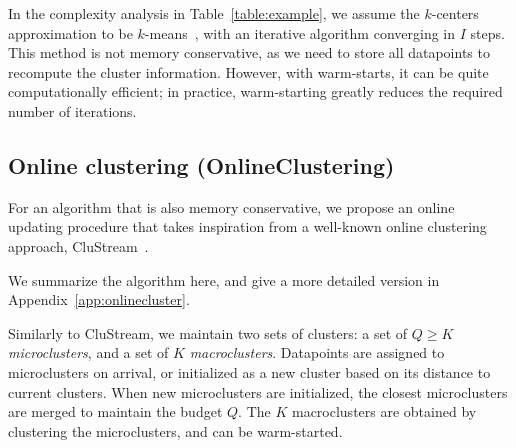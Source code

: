  

In the complexity analysis in Table~\ref{table:example}, we assume the $k$-centers approximation to be $k$-means~\cite{kmeans}, with an iterative algorithm converging in $I$ steps. 
This method is not memory conservative, as we need to store all datapoints to recompute the cluster information. 
However, with warm-starts, it can be quite computationally efficient; in practice, warm-starting greatly reduces the required number of iterations.


\subsection{Online clustering (OnlineClustering)}
\label{sec:clustream}
For an algorithm that is also memory conservative, we propose an online updating procedure that takes inspiration from  a well-known online clustering approach,  CluStream~\cite{clustream}.

We summarize the algorithm here, and give a more detailed version in Appendix~\ref{app:onlinecluster}.

Similarly to CluStream, we maintain two sets of clusters: a set of $Q \geq K$ {\it microclusters}, and a set of $K$ {\it macroclusters}.
Datapoints are assigned to microclusters on arrival, or initialized as a new cluster based on its distance to current clusters. When new microclusters are initialized, the closest microclusters are merged to maintain the budget $Q$. The $K$ macroclusters are obtained by clustering the microclusters, and can be warm-started. 

